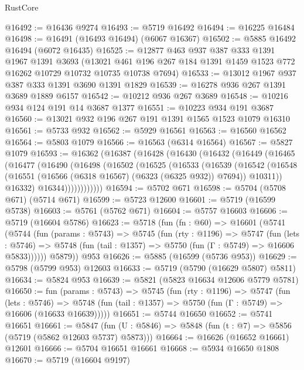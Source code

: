 \begin{lexlean}{RustCore}
\begin{coremodule}
@16492 := @16436 @9274
@16493 := @5719 @16492
@16494 := @16225 @16484
@16498 := @16491 (@16493 @16494) (@6067 @16367)
@16502 := @5885 @16492 @16494 (@6072 @16435)
@16525 := @12877
    @463
    @937
    @387
    @333
    @1391
    @1967
    @1391
    @3693
    (@13021 @461 @196 @267 @184 @1391 @1459 @1523 @772 @16262 @10729 @10732 @10735 @10738 @7694)
@16533 := @13012 @1967 @937 @387 @333 @1391 @3690 @1391 @1829
@16539 := @16278 @936 @267 @1391 @3689 @1889 @6157
@16542 := @10212 @936 @267 @3689
@16548 := @10216 @934 @124 @191 @14 @3687 @1377
@16551 := @10223 @934 @191 @3687
@16560 := @13021 @932 @196 @267 @191 @1391 @1565 @1523 @1079 @16310
@16561 := @5733 @932
@16562 := @5929 @16561
@16563 := @16560 @16562
@16564 := @5803 @1079
@16566 := @16563 (@6314 @16564)
@16567 := @5827 @1079
@16593 := @16362
    (@16387
      (@16428
        (@16430
          (@16432
            (@16449
              (@16465
                (@16477
                  (@16490
                    (@16498
                      (@16502
                        (@16525
                          (@16533
                            (@16539
                              (@16542
                                (@16548
                                  (@16551 (@16566 (@6318 @16567) (@6323 (@6325 @932)) @7694))
                                  @10311))
                              @16332)
                            @16344))))))))))))
@16594 := @5702 @671
@16598 := @5704 (@5708 @671) (@5714 @671)
@16599 := @5723 @12600
@16601 := @5719 (@16599 @5738)
@16603 := @5761 (@5762 @671)
@16604 := @5757 @16603
@16606 := @5719 (@16604 @5786)
@16623 := @5718
    (fun (fn : @60) =>
    @16601
      (@5741
        (@5744
          (fun (params : @5743) =>
          @5745
            (fun (rty : @1196) =>
            @5747
              (fun (lets : @5746) =>
              @5748 (fun (tail : @1357) => @5750 (fun (Γ : @5749) => @16606 @5833))))))
        @5879))
    @953
@16626 := @5885 (@16599 (@5736 @953))
@16629 := @5798 (@5799 @953) @12603
@16633 := @5719 (@5790 (@16629 @5807) @5811)
@16634 := @5824 @953
@16639 := @5821 (@5823 @16634 @12606 @5779 @5781)
@16650 := fun (params : @5743) =>
  @5745
    (fun (rty : @1196) =>
    @5747
      (fun (lets : @5746) =>
      @5748 (fun (tail : @1357) => @5750 (fun (Γ : @5749) => @16606 (@16633 @16639)))))
@16651 := @5744 @16650
@16652 := @5741 @16651
@16661 := @5847
    (fun (U : @5846) => @5848 (fun (t : @7) => @5856 (@5719 (@5862 @12603 @5737) @5873)))
@16664 := @16626 (@16652 @16661) @12601
@16666 := @5704 @16651 @16661
@16668 := @5934 @16650 @1808
@16670 := @5719 (@16604 @9197)

\end{coremodule}
\end{lexlean}
